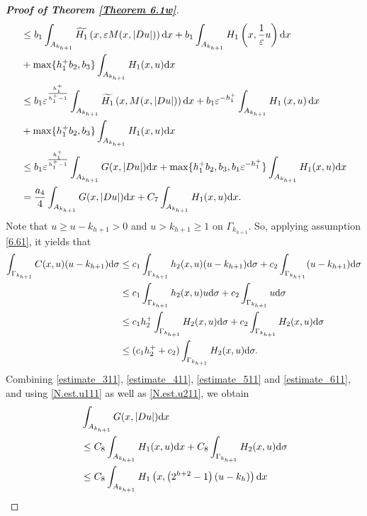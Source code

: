 \documentclass[10pt,reqno]{amsart}
\newcommand *\w{^\wedge}
\theoremstyle{definition}
\numberwithin{equation}{section}
\begin{document}
\begin{proof}[\textbf{Proof of Theorem \ref{Theorem 6.1w}}]
\begin{align}
\begin{split}
        & \leq b_1\int_{A_{k_{h+1}} }\widetilde{H_1}\left(x,\varepsilon M(x,|D u|)\right){\rm d}x + b_1\int_{A_{k_{h+1}} }H_1\left(x,\frac{1}{\varepsilon}u\right){\rm d}x\\
        &+\max\{h_1^+b_2,b_3\}\int_{A_{k_{h+1}}}H_1(x,u){\rm d}x \\
        & \leq b_1\varepsilon^{\frac{h_1^+}{h_1^+-1}}\int_{A_{k_{h+1}} }\widetilde{H_1}\left(x, M(x,|D u|)\right){\rm d}x + b_1\varepsilon^{-h_1^+}\int_{A_{k_{h+1}} }H_1\left(x,u\right){\rm d}x\\
        &+\max\{h_1^+b_2,b_3\}\int_{A_{k_{h+1}}}H_1(x,u){\rm d}x \\
        & \leq b_1\varepsilon^{\frac{h_1^+}{h_1^+-1}}\int_{A_{k_{h+1}} }G(x,|D u|){\rm d}x +\max\{h_1^+b_2,b_3,b_1\varepsilon^{-h_1^+}\}\int_{A_{k_{h+1}}}H_1(x,u){\rm d}x\\ 
	& = \frac{a_4}{4}\int_{A_{k_{h+1}} }G(x,|D u|){\rm d}x +C_7\int_{A_{k_{h+1}}}H_1(x,u){\rm d}x.
		\end{split}
	\end{align}
 Note that $u\geq u-k_{h+1} >0$ and $u> k_{h+1} \geq 1$ on $\Gamma_{k_{h+1}}$. So, applying assumption \eqref{6.61}, it yields that
	\begin{align}\label{estimate_611}
		\begin{split}
			\int_{\Gamma_{k_{h+1}} }C(x,u)(u-k_{h+1}) {\rm d}\sigma
			& \leq c_1 \int_{\Gamma_{k_{h+1}} }h_2(x,u) (u-k_{h+1}){\rm d}\sigma+c_2 \int_{\Gamma_{k_{h+1}} }(u-k_{h+1}) {\rm d}\sigma\\
            & \leq c_1 \int_{\Gamma_{k_{h+1}} }h_2(x,u) u{\rm d}\sigma+c_2 \int_{\Gamma_{k_{h+1}} }u {\rm d}\sigma\\
            & \leq c_1 h_2^+ \int_{\Gamma_{k_{h+1}} }H_2(x,u) {\rm d}\sigma+c_2 \int_{\Gamma_{k_{h+1}} }H_2(x,u) {\rm d}\sigma\\
			& \leq (c_1h_2^++c_2)\int_{\Gamma_{k_{h+1}} }H_2(x,u) {\rm d}\sigma.
		\end{split}
	\end{align}
	Combining \eqref{estimate_311}, \eqref{estimate_411}, \eqref{estimate_511} and \eqref{estimate_611}, and using \eqref{N.est.u111} as well as \eqref{N.est.u211}, we obtain
	\begin{align*}
		&\int_{A_{k_{h+1}}}G(x,|D u|){\rm d}x\\
		& \leq  C_8\int_{A_{k_{h+1}}}H_1(x,u){\rm d}x+C_8\int_{\Gamma_{k_{h+1}}}H_2(x,u){\rm d} \sigma\\
		&\leq C_8\int_{A_{k_{h+1}}}H_1\left(x,\left(2^{h+2}-1\right)(u-k_{h})\right){\rm d}x\\

\end{align*}
\end{proof}
\end{document}
